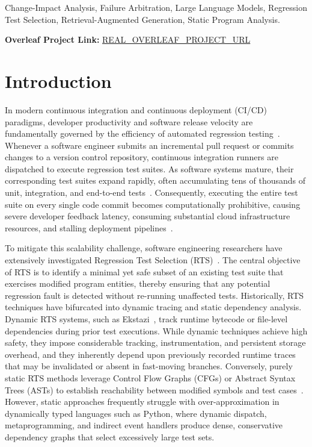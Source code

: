 \documentclass[12pt,onecolumn,draftclsnofoot]{IEEEtran}
\begin{document}
\begin{IEEEkeywords}
Change-Impact Analysis, Failure Arbitration, Large Language Models, Regression Test Selection, Retrieval-Augmented Generation, Static Program Analysis.
\end{IEEEkeywords}

\vspace{0.5em}
\noindent\textbf{Overleaf Project Link:} \url{REAL_OVERLEAF_PROJECT_URL}

\section{Introduction}
\label{sec:introduction}

In modern continuous integration and continuous deployment (CI/CD) paradigms, developer productivity and software release velocity are fundamentally governed by the efficiency of automated regression testing~\cite{memon2017taming}. Whenever a software engineer submits an incremental pull request or commits changes to a version control repository, continuous integration runners are dispatched to execute regression test suites. As software systems mature, their corresponding test suites expand rapidly, often accumulating tens of thousands of unit, integration, and end-to-end tests~\cite{yoo2012regression}. Consequently, executing the entire test suite on every single code commit becomes computationally prohibitive, causing severe developer feedback latency, consuming substantial cloud infrastructure resources, and stalling deployment pipelines~\cite{machalica2019predictive}.

To mitigate this scalability challenge, software engineering researchers have extensively investigated Regression Test Selection (RTS)~\cite{rothermel1996analyzing,engstrom2010systematic}. The central objective of RTS is to identify a minimal yet safe subset of an existing test suite that exercises modified program entities, thereby ensuring that any potential regression fault is detected without re-running unaffected tests. Historically, RTS techniques have bifurcated into dynamic tracing and static dependency analysis. Dynamic RTS systems, such as Ekstazi~\cite{gligoric2015practical}, track runtime bytecode or file-level dependencies during prior test executions. While dynamic techniques achieve high safety, they impose considerable tracking, instrumentation, and persistent storage overhead, and they inherently depend upon previously recorded runtime traces that may be invalidated or absent in fast-moving branches. Conversely, purely static RTS methods leverage Control Flow Graphs (CFGs) or Abstract Syntax Trees (ASTs) to establish reachability between modified symbols and test cases~\cite{rothermel1996analyzing}. However, static approaches frequently struggle with over-approximation in dynamically typed languages such as Python, where dynamic dispatch, metaprogramming, and indirect event handlers produce dense, conservative dependency graphs that select excessively large test sets.
\end{document}
